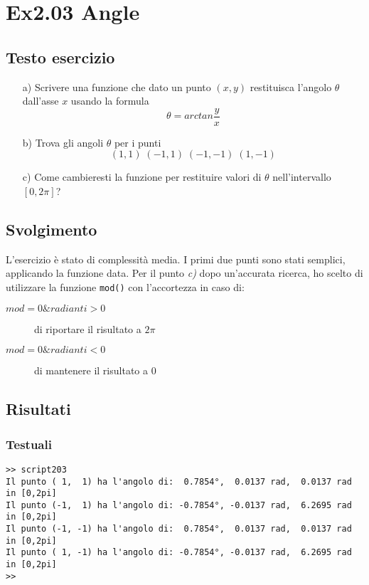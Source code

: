 \section{Ex2.03 Angle}\label{sec:Angle}

\subsection{Testo esercizio}
\begin{itemize}
    \item[a)]Scrivere una funzione che dato un punto $(x, y)$ restituisca 
    l'angolo $\theta$ dall'asse $x$ usando la formula
    $$\theta = arctan\frac{y}{x}$$
    
    \item[b)]Trova gli angoli $\theta$ per i punti
    $$(1,1)\;(-1,1)\;(-1,-1)\;(1,-1)$$
    
    \item[c)] Come cambieresti la funzione per restituire valori di $\theta$ 
    nell'intervallo $[0, 2\pi]$?
\end{itemize}

\subsection{Svolgimento}
L'esercizio è stato di complessità media. I primi due punti sono stati 
semplici, applicando la funzione data. Per il punto \textit{c)} dopo 
un'accurata ricerca, ho scelto di utilizzare la funzione \verb|mod()| con 
l'accortezza in caso di:
\begin{description}
    \item[$mod=0 \& radianti > 0$] di riportare il risultato a $2\pi$
    
    \item[$mod=0 \& radianti < 0$] di mantenere il risultato a $0$
\end{description}

\subsection{Risultati}
\subsubsection{Testuali}
\color{gray}
\begin{verbatim}
>> script203
Il punto ( 1,  1) ha l'angolo di:  0.7854°,  0.0137 rad,  0.0137 rad in [0,2pi]
Il punto (-1,  1) ha l'angolo di: -0.7854°, -0.0137 rad,  6.2695 rad in [0,2pi]
Il punto (-1, -1) ha l'angolo di:  0.7854°,  0.0137 rad,  0.0137 rad in [0,2pi]
Il punto ( 1, -1) ha l'angolo di: -0.7854°, -0.0137 rad,  6.2695 rad in [0,2pi]
>> 
\end{verbatim}
\color{black}

